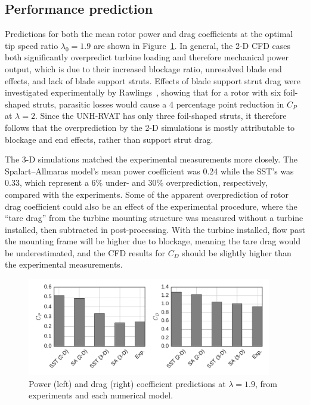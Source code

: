 \documentclass[aip,graphicx]{revtex4-1}
\begin{document}
\subsection{Performance prediction}

Predictions for both the mean rotor power and drag coefficients at the optimal
tip speed ratio $\lambda_0 = 1.9$ are shown in
Figure~\ref{fig:br-cfd-perf-bar-chart}. In general, the 2-D CFD cases both
significantly overpredict turbine loading and therefore mechanical power output,
which is due to their increased blockage ratio, unresolved blade end effects,
and lack of blade support struts. Effects of blade support strut drag were
investigated experimentally by Rawlings~\cite{Rawlings2008}, showing that for a
rotor with six foil-shaped struts, parasitic losses would cause a 4 percentage
point reduction in $C_P$ at $\lambda=2$. Since the UNH-RVAT has only three
foil-shaped struts, it therefore follows that the overprediction by the 2-D
simulations is mostly attributable to blockage and end effects, rather than
support strut drag.

The 3-D simulations matched the experimental measurements more closely. The
Spalart--Allmaras model's mean power coefficient was 0.24 while the SST's was
0.33, which represent a 6\% under- and 30\% overprediction, respectively,
compared with the experiments. Some of the apparent overprediction of rotor drag
coefficient could also be an effect of the experimental procedure, where the
``tare drag'' from the turbine mounting structure was measured without a turbine
installed, then subtracted in post-processing. With the turbine installed, flow
past the mounting frame will be higher due to blockage, meaning the tare drag
would be underestimated, and the CFD results for $C_D$ should be slightly higher
than the experimental measurements.

\begin{figure}
    \centering

    \includegraphics[width=0.95\textwidth]{perf_bar_chart}

    \caption{Power (left) and drag (right) coefficient predictions at $\lambda =
    1.9$, from experiments and each numerical model.}

    \label{fig:br-cfd-perf-bar-chart}
\end{figure}
\end{document}
